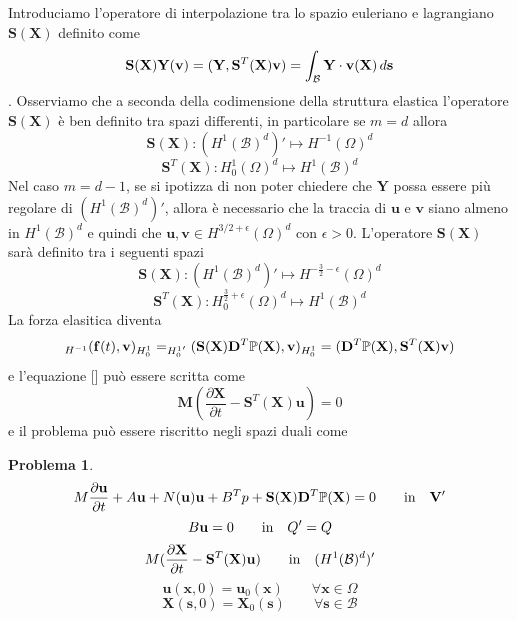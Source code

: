 \documentclass{book}
\newtheorem{problem}[theorem]{Problema}
\begin{document}
Introduciamo l'operatore di interpolazione tra lo spazio euleriano e lagrangiano $\mathbf{S}(\mathbf{X})$ definito come
$$\mathbf{S}(\mathbf{X})\mathbf{Y}(\mathbf{v}) = \ps{\mathbf{Y}}{\mathbf{S}^T(\mathbf{X})\mathbf{v}} = \int_\mathcal{B}\mathbf{Y}\cdot\mathbf{v}(\mathbf{X})\, d\mathbf{s}$$.
Osserviamo che a seconda della codimensione della struttura elastica l'operatore $\mathbf{S}(\mathbf{X})$ è ben definito tra spazi differenti, in particolare se $m=d$ allora 
\begin{equation}
\mathbf{S}(\mathbf{X}):(H^1(\mathcal{B})^d)'\mapsto H^{-1}(\Omega)^d
\end{equation}
\begin{equation}
\mathbf{S}^T(\mathbf{X}):H^1_0(\Omega)^d\mapsto H^{1}(\mathcal{B})^d
\end{equation}
Nel caso $m=d-1$, se si ipotizza di non poter chiedere che $\mathbf{Y}$ possa essere più regolare di $(H^1(\mathcal{B})^d)'$, allora è necessario che la traccia di $\mathbf{u}$ e $\mathbf{v}$ siano almeno in $H^1(\mathcal{B})^d$ e quindi che $\mathbf{u},\mathbf{v}\in H^{3/2+\epsilon}(\Omega)^d$ con $\epsilon>0$.
L'operatore $\mathbf{S}(\mathbf{X})$ sarà definito tra i seguenti spazi
\begin{equation}
\mathbf{S}(\mathbf{X}):(H^1(\mathcal{B})^d)'\mapsto H^{-\frac{3}{2}-\epsilon}(\Omega)^d
\end{equation}
\begin{equation}
\mathbf{S}^T(\mathbf{X}):H^{\frac{3}{2}+\epsilon}_0(\Omega)^d\mapsto H^{1}(\mathcal{B})^d
\end{equation}
La forza elasitica diventa
\begin{equation}
\ps{\mathbf{f}(t)}{\mathbf{v}}[H^{-1}][H^1_0] = \ps{\mathbf{S}(\mathbf{X})\mathbf{D}^T\mathbb{P}(\mathbf{X})}{\mathbf{v}}[H^1_0]=\ps{\mathbf{D}^T\mathbb{P}(\mathbf{X})}{\mathbf{S}^T(\mathbf{X})\mathbf{v}}
\end{equation}
e l'equazione [] può essere scritta come
\begin{equation}
\mathbf{M}\left (\frac{\partial\mathbf{X}}{\partial t}-\mathbf{S}^T(\mathbf{X})\mathbf{u}\right )=0
\end{equation}
e il problema può essere riscritto negli spazi duali come
\begin{problem}
$$M\frac{\partial\mathbf{u}}{\partial t}+A\mathbf{u}+N(\mathbf{u})\mathbf{u}+B^{T}p+\mathbf{S}(\mathbf{X})\mathbf{D}^{T}\mathbb{P}(\mathbf{X})=0 \qquad \text{in\quad}\mathbf{V}'$$
$$B\mathbf{u}=0 \qquad \text{in\quad}Q'=Q$$
$$M(\frac{\partial \mathbf{X}}{\partial t}-\mathbf{S}^{T}(\mathbf{X})\mathbf{u}) \qquad \text{in\quad}(H^{1}(\mathcal{B})^{d})'$$
$$\mathbf{u}(\mathbf{x},0)=\mathbf{u}_{0}(\mathbf{x}) \qquad \forall\mathbf{x}\in\Omega$$
$$\mathbf{X}(\mathbf{s},0)=\mathbf{X}_{0}(\mathbf{s}) \qquad \forall\mathbf{s}\in\mathcal{B}$$
\end{problem}
\end{document}
